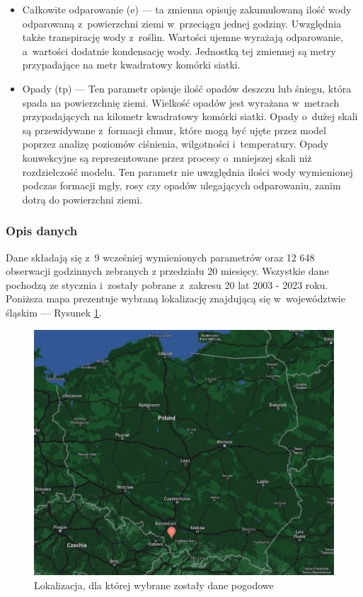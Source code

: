 \begin{itemize}
    \item Całkowite odparowanie (e) — ta zmienna opisuję zakumulowaną ilość wody odparowaną z~powierzchni
    ziemi w~przeciągu jednej godziny. Uwzględnia także transpirację wody z~roślin. Wartości ujemne
    wyrażają odparowanie, a~wartości dodatnie kondensację wody. Jednostką tej zmiennej są metry
    przypadające na metr kwadratowy komórki siatki.

    \item Opady (tp) — Ten parametr opisuje ilość opadów deszczu lub śniegu, która spada na powierzchnię ziemi.
    Wielkość opadów jest wyrażana w~metrach przypadających na kilometr kwadratowy komórki siatki.
    Opady o~dużej skali są przewidywane z~formacji chmur, które mogą być ujęte przez model poprzez 
    analizę poziomów ciśnienia, wilgotności i~temperatury. 
    Opady konwekcyjne są reprezentowane przez procesy
    o~mniejszej skali niż rozdzielczość modelu. Ten parametr nie uwzględnia ilości wody wymienionej
    podczas formacji mgły, rosy czy opadów ulegających odparowaniu, zanim dotrą do powierzchni ziemi.

\end{itemize}

\subsubsection*{Opis danych}

Dane składają się z~9 wcześniej wymienionych parametrów oraz 12 648 obserwacji godzinnych zebranych
z przedziału 20 miesięcy. Wszystkie dane pochodzą ze stycznia i~zostały pobrane z~zakresu 20 lat
2003 - 2023 roku. Poniższa mapa prezentuje wybraną lokalizację znajdującą się w~województwie śląskim — Rysunek \ref{map}.

\begin{figure}[H]
    \centering
    \includegraphics[width=\textwidth]{images/map.png}
    \caption{Lokalizacja, dla której wybrane zostały dane pogodowe}
    \label{map}
\end{figure}

